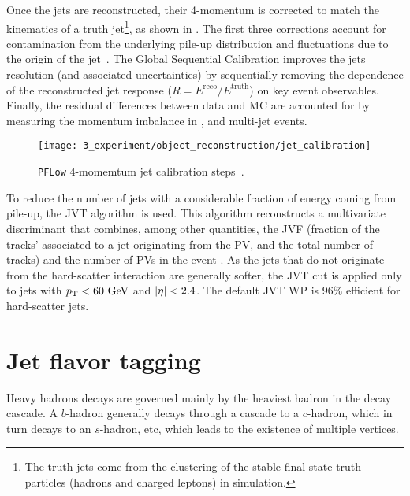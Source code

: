 Once the jets are reconstructed, their 4-momentum is corrected to match the kinematics of a truth jet\footnote{The truth jets come from the \antikt clustering of the stable final state truth particles (hadrons and charged leptons) in simulation.}, as shown in \Fig{\ref{fig:objects:jets:jet_calib:jet_calib_sequence}}. The first three corrections account for contamination from the underlying pile-up distribution and fluctuations due to the origin of the jet~\cite{ATLAS-Jet-Calibration-Run2}. The Global Sequential Calibration improves the jets \pt resolution (and associated uncertainties) by sequentially removing the dependence of the reconstructed jet response (\(R= E^{\text{reco}} / E^{\text{truth}}\)) on key event observables. Finally, the residual differences between data and \ac{MC} are accounted for by
measuring the momentum imbalance in \Zjets, \gammajet and multi-jet events.

\begin{figure}[ht!]
    \centering
    \texttt{[image: 3\_experiment/object\_reconstruction/jet\_calibration]}
    \caption{\texttt{PFLow} 4-momemtum jet calibration steps~\cite{ATLAS-Jet-Calibration-Run2}.}
    \label{fig:objects:jets:jet_calib:jet_calib_sequence}
\end{figure}

To reduce the number of jets with a considerable fraction of energy coming from pile-up, the \ac{JVT} algorithm is used. This algorithm  reconstructs a multivariate discriminant that combines, among other quantities, the \ac{JVF} (fraction of the tracks' \pt associated to a jet originating from the \ac{PV}, and the total number of tracks) and the number of \acp{PV} in the event \Npv. As the jets that do not originate from the hard-scatter interaction are generally softer, the \ac{JVT} cut is applied only to jets with \(p_{\text{T}}<60~\text{GeV}\) and \(|\eta|<2.4\). The default \ac{JVT} \ac{WP} is \(96\%\) efficient for hard-scatter jets.
















\section{Jet flavor tagging}

Heavy hadrons decays are governed mainly by the heaviest hadron in the decay cascade. A \(b\)-hadron generally decays through a cascade to a \(c\)-hadron, which in turn decays to an \(s\)-hadron, etc, which leads to the existence of multiple vertices.

